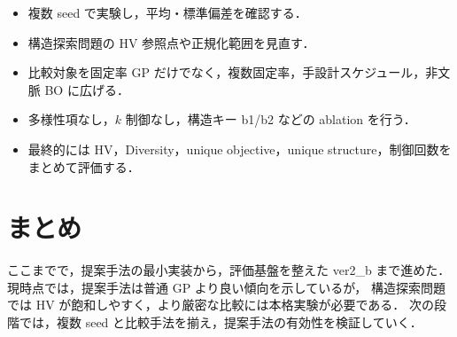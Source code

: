 \documentclass[a4paper,11pt]{ltjsarticle}
\begin{document}
\begin{itemize}[leftmargin=3em]
  \item 複数 seed で実験し，平均・標準偏差を確認する．
  \item 構造探索問題の HV 参照点や正規化範囲を見直す．
  \item 比較対象を固定率 GP だけでなく，複数固定率，手設計スケジュール，非文脈 BO に広げる．
  \item 多様性項なし，\(k\) 制御なし，構造キー b1/b2 などの ablation を行う．
  \item 最終的には HV，Diversity，unique objective，unique structure，制御回数をまとめて評価する．
\end{itemize}

\section{まとめ}

ここまでで，提案手法の最小実装から，評価基盤を整えた ver2\_b まで進めた．
現時点では，提案手法は普通 GP より良い傾向を示しているが，
構造探索問題では HV が飽和しやすく，より厳密な比較には本格実験が必要である．
次の段階では，複数 seed と比較手法を揃え，提案手法の有効性を検証していく．
\end{document}
